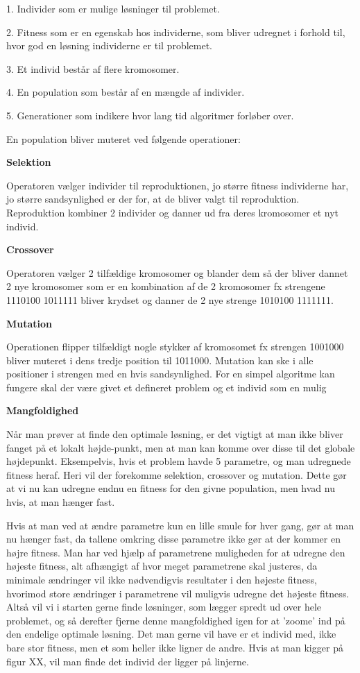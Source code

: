1.	Individer som er mulige løsninger til problemet.

2.	Fitness som er en egenskab hos individerne, som bliver udregnet i forhold til, hvor god en løsning individerne er til problemet.

3.	Et individ består af flere kromosomer.

4.	En population som består af en mængde af individer.

5.	Generationer som indikere hvor lang tid algoritmer forløber over.

En population bliver muteret ved følgende operationer:

\textbf{Selektion}

Operatoren vælger individer til reproduktionen, jo større fitness individerne har, jo større sandsynlighed er der for, at de bliver valgt til reproduktion. Reproduktion kombiner 2 individer og danner ud fra deres kromosomer et nyt individ.

\textbf{Crossover}

Operatoren vælger 2 tilfældige kromosomer og blander dem så der bliver dannet 2 nye kromosomer som er en kombination af de 2 kromosomer fx strengene 1110100 1011111 bliver krydset og danner de 2 nye strenge 1010100 1111111.

\textbf{Mutation}

Operationen flipper tilfældigt nogle stykker af kromosomet fx strengen 1001000 bliver muteret i dens tredje position til 1011000. Mutation kan ske i alle positioner i strengen med en hvis sandsynlighed. For en simpel algoritme kan fungere skal der være givet et defineret problem og et individ som en mulig

\textbf{Mangfoldighed}

Når man prøver at finde den optimale løsning, er det vigtigt at man ikke bliver fanget på et lokalt højde-punkt, men at man kan komme over disse til det globale højdepunkt. Eksempelvis, hvis et problem havde 5 parametre, og man udregnede fitness heraf. Heri vil der forekomme selektion, crossover og mutation. Dette gør at vi nu kan udregne endnu en fitness for den givne population, men hvad nu hvis, at man hænger fast. 

Hvis at man ved at ændre parametre kun en lille smule for hver gang, gør at man nu hænger fast, da tallene omkring disse parametre ikke gør at der kommer en højre fitness. Man har ved hjælp af parametrene muligheden for at udregne den højeste fitness, alt afhængigt af hvor meget parametrene skal justeres, da minimale ændringer vil ikke nødvendigvis resultater i den højeste fitness, hvorimod store ændringer i parametrene vil muligvis udregne det højeste fitness. Altså vil vi i starten gerne finde løsninger, som lægger spredt ud over hele problemet, og så derefter fjerne denne mangfoldighed igen for at ’zoome’ ind på den endelige optimale løsning. 
Det man gerne vil have er et individ med, ikke bare stor fitness, men et som heller ikke ligner de andre. Hvis at man kigger på figur XX, vil man finde det individ der ligger på linjerne.

